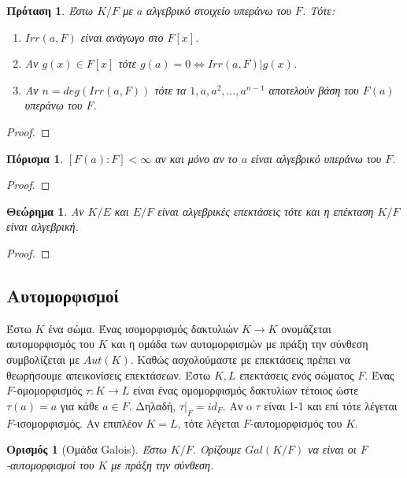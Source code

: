 \documentclass[oneside,a4paper]{article}
\newtheorem{theorem}{Θεώρημα}
\newtheorem*{defn}{Ορισμός}
\newtheorem{prop}{Πρόταση}
\newtheorem{cor}{Πόρισμα}
\newcommand {\tl}{\textlatin}
\begin{document}
\begin{prop}
	Έστω $K/F$ με $a$ αλγεβρικό στοιχείο υπεράνω του $F$. Τότε:
	\begin{enumerate}
		\item $Irr(a,F)$ είναι ανάγωγο στο $F[x]$.
		\item Αν $g(x) \in F[x]$ τότε $g(a) = 0 \iff Irr(a,F) | g(x)$.
		\item Αν $n = deg(Irr(a,F))$ τότε τα $1,a,a^2,\ldots,a^{n-1}$ αποτελούν βάση του $F(a)$ υπεράνω του $F$.
	\end{enumerate}
\end{prop}
\begin{proof}
\end{proof}

\begin{cor}  $[F(a): F] < \infty$ αν και μόνο αν το $a$ είναι αλγεβρικό υπεράνω του $F$.
\end{cor}

\begin{proof}
\end{proof}


\begin{theorem}Αν $K/E$ και $E/F$ είναι αλγεβρικές επεκτάσεις τότε και η επέκταση $K/F$ είναι αλγεβρική.
\end{theorem}

\begin{proof}
\end{proof}

\subsection{Αυτομορφισμοί}
\vspace{1cm}

Έστω $K$ ένα σώμα. Ένας ισομορφισμός δακτυλιών $K \rightarrow K$ ονομάζεται αυτομορφισμός του $K$ και η ομάδα των αυτομορφισμών με πράξη την σύνθεση συμβολίζεται με $Aut(K)$. Καθώς ασχολούμαστε με επεκτάσεις πρέπει να θεωρήσουμε απεικονίσεις επεκτάσεων. Έστω $K,L$ επεκτάσεις ενός σώματος $F$. Ένας $F$-ομομορφισμός $\tau : K \rightarrow L$ είναι ένας ομομορφισμός δακτυλίων τέτοιος ώστε $\tau (a) = a$ για κάθε $a \in F$. Δηλαδή, $\tau |_F = id_F$. Αν o $\tau$ είναι 1-1 και επί τότε λέγεται $F$-ισομορφισμός. Αν επιπλέον $K=L$, τότε λέγεται $F$-αυτομορφισμός του $K$.

\begin{defn}[Ομάδα \tl{Galois}]
	Έστω $K/F$. Ορίζουμε $Gal(K/F)$ να είναι οι $F$-αυτομορφισμοί του $K$ με πράξη την σύνθεση.
\end{defn}
\end{document}
